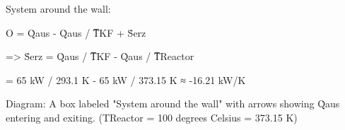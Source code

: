 System around the wall:  

O = Q̇aus - Q̇aus / T̅KF + Ṡerz  

=> Ṡerz = Q̇aus / T̅KF - Q̇aus / T̅Reactor  

= 65 kW / 293.1 K - 65 kW / 373.15 K  
≈ -16.21 kW/K  

Diagram:  
A box labeled "System around the wall" with arrows showing Q̇aus entering and exiting.  
(TReactor = 100 degrees Celsius = 373.15 K)